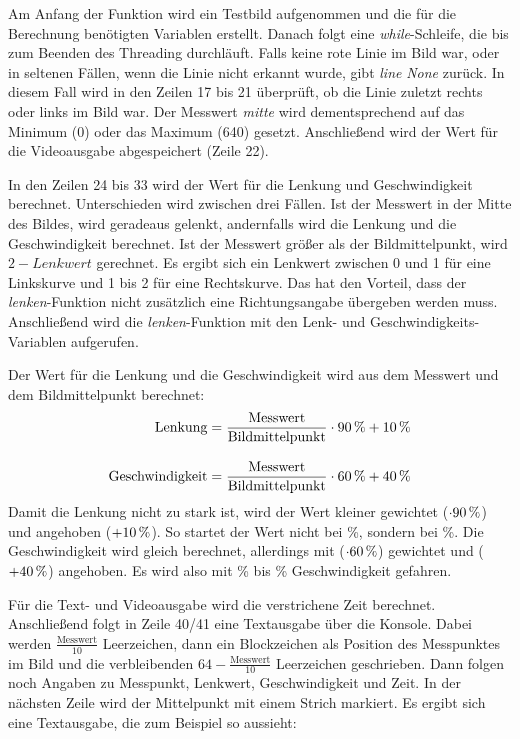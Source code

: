 \documentclass[a4paper, 12pt]{scrartcl}
\begin{document}
Am Anfang der Funktion wird ein Testbild aufgenommen und die für die Berechnung benötigten Variablen erstellt. Danach folgt eine \textit{while}-Schleife, die bis zum Beenden des Threading durchläuft.
Falls keine rote Linie im Bild war, oder in seltenen Fällen, wenn die Linie nicht erkannt wurde, gibt \textit{line} \textit{None} zurück. In diesem Fall wird in den Zeilen 17 bis 21 überprüft, ob die Linie zuletzt rechts oder links im Bild war. Der Messwert \textit{mitte} wird dementsprechend auf das Minimum (0) oder das Maximum (640) gesetzt. Anschließend wird der Wert für die Videoausgabe abgespeichert (Zeile 22).

In den Zeilen 24 bis 33 wird der Wert für die Lenkung und Geschwindigkeit berechnet. Unterschieden wird zwischen drei Fällen. Ist der Messwert in der Mitte des Bildes, wird geradeaus gelenkt, andernfalls wird die Lenkung und die Geschwindigkeit berechnet. Ist der Messwert größer als der Bildmittelpunkt, wird $2-\textit{Lenkwert}$ gerechnet. Es ergibt sich ein Lenkwert zwischen 0 und 1 für eine Linkskurve und 1 bis 2 für eine Rechtskurve. Das hat den Vorteil, dass der \textit{lenken}-Funktion nicht zusätzlich eine Richtungsangabe übergeben werden muss. Anschließend wird die \textit{lenken}-Funktion mit den Lenk- und Geschwindigkeits-Variablen aufgerufen.

Der Wert für die Lenkung und die Geschwindigkeit wird aus dem Messwert und dem Bildmittelpunkt berechnet:
\begin{align}
\text{Lenkung}&=\frac{\text{Messwert}}{\text{Bildmittelpunkt}}\cdot\unit[90]{\%}+\unit[10]{\%}\\[2ex]
\text{Geschwindigkeit}&=\frac{\text{Messwert}}{\text{Bildmittelpunkt}}\cdot\unit[60]{\%} + \unit[40]{\%}
\end{align}
Damit die Lenkung nicht zu stark ist, wird der Wert kleiner gewichtet ($\cdot\unit[90]{\%}$) und angehoben ($+\unit[10]{\%}$). So startet der Wert nicht bei \unit[0]{\%}, sondern bei \unit[10]{\%}.
Die Geschwindigkeit wird gleich berechnet, allerdings mit ($\cdot\unit[60]{\%}$) gewichtet und ($+\unit[40]{\%}$) angehoben. Es wird also mit \unit[60]{\%} bis \unit[100]{\%} Geschwindigkeit gefahren.

Für die Text- und Videoausgabe wird die verstrichene Zeit berechnet. Anschließend folgt in Zeile 40/41 eine Textausgabe über die Konsole. Dabei werden $\frac{\text{Messwert}}{10}$ Leerzeichen, dann ein Blockzeichen als Position des Messpunktes im Bild und die verbleibenden $64-\frac{\text{Messwert}}{10}$ Leerzeichen geschrieben. Dann folgen noch Angaben zu Messpunkt, Lenkwert, Geschwindigkeit und Zeit. In der nächsten Zeile wird der Mittelpunkt mit einem Strich markiert. Es ergibt sich eine Textausgabe, die zum Beispiel so aussieht:
\end{document}
